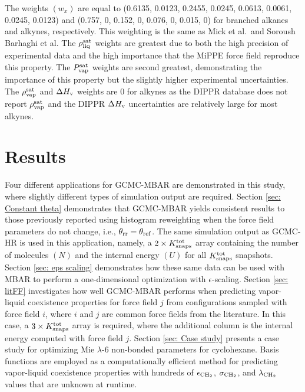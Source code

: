 \documentclass[journal=jced,manuscript=article]{achemso}
\begin{document}
The weights $(w_x)$ are equal to (0.6135, 0.0123, 0.2455, 0.0245, 0.0613, 0.0061, 0.0245, 0.0123) and (0.757, 0, 0.152, 0, 0.076, 0, 0.015, 0) for branched alkanes and alkynes, respectively. This weighting is the same as Mick et al.~and Soroush Barhaghi et al. The $\rho_{\rm liq}^{\rm sat}$ weights are greatest due to both the high precision of experimental data and the high importance that the MiPPE force field reproduce this property. The $P_{\rm vap}^{\rm sat}$ weights are second greatest, demonstrating the importance of this property but the slightly higher experimental uncertainties. The $\rho_{\rm vap}^{\rm sat}$ and $\Delta H_{\rm v}$ weights are 0 for alkynes as the DIPPR database does not report $\rho_{\rm vap}^{\rm sat}$ and the DIPPR $\Delta H_{\rm v}$ uncertainties are relatively large for most alkynes.


\section{Results} \label{sec: Results}

Four different applications for GCMC-MBAR are demonstrated in this study, where slightly different types of simulation output are required. Section \ref{sec: Constant theta} demonstrates that GCMC-MBAR yields consistent results to those previously reported using histogram reweighting when the force field parameters do not change, i.e., $\theta_{\rm rr} = \theta_{\rm ref}$. The same simulation output as GCMC-HR is used in this application, namely, a $2 \times K^{\rm tot}_{\rm snaps}$ array containing the number of molecules $(N)$ and the internal energy $(U)$ for all $K^{\rm tot}_{\rm snaps}$ snapshots. Section \ref{sec: eps scaling} demonstrates how these same data can be used with MBAR to perform a one-dimensional optimization with $\epsilon$-scaling. Section \ref{sec: litFF} investigates how well GCMC-MBAR performs when predicting vapor-liquid coexistence properties for force field $j$ from configurations sampled with force field $i$, where $i$ and $j$ are common force fields from the literature. In this case, a $3 \times K^{\rm tot}_{\rm snaps}$ array is required, where the additional column is the internal energy computed with force field $j$. Section \ref{sec: Case study} presents a case study for optimizing Mie $\lambda$-6 non-bonded parameters for cyclohexane. Basis functions are employed as a computationally efficient method for predicting vapor-liquid coexistence properties with hundreds of $\epsilon_{\rm CH_2}$, $\sigma_{\rm CH_2}$, and $\lambda_{\rm CH_2}$ values that are unknown at runtime.   
\end{document}
